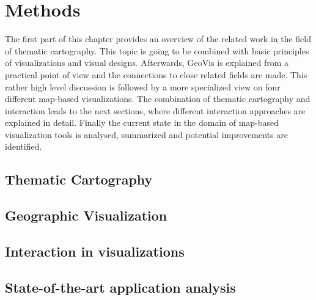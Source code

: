 \section{Methods}
The first part of this chapter provides an overview of the related work in the field of
thematic cartography. This topic is going to be combined with basic principles of visualizations and visual designs. Afterwards, \ac{GeoVis} is explained from a practical point of view and the connections to close related fields are made. This rather high level discussion is followed by a more specialized view on four different map-based visualizations. The combination of thematic cartography and interaction leads to the next sections, where different interaction approaches are explained in detail. Finally the current state in the domain of map-based visualization tools is analysed, summarized and potential improvements are identified.

\subsection{Thematic Cartography}
\label{s:cartography}


\subsection{Geographic Visualization}
\label{s:geovis-practical}


\subsection{Interaction in visualizations}
\label{s:interaction}


\subsection{State-of-the-art application analysis}
